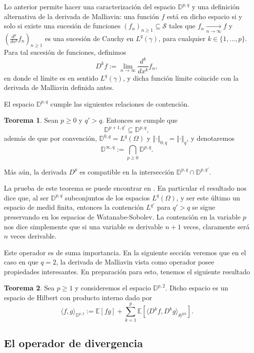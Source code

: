 \documentclass[letterpaper,twoside,12pt]{book}
\newcommand{\D}{\mathbb{D}}
\renewcommand{\S}{\mathcal{S}}
\newcommand{\E}{\mathbb{E}}
\newcommand{\1}{\mathds{1}}
\renewcommand{\to}{\rightarrow}
\newcommand{\norm}[1]{\left\Vert #1 \right\Vert}
\theoremstyle{definition}
\theoremstyle{definition}
\newtheorem{teo}{Teorema}
\theoremstyle{remark}
\theoremstyle{definition}
\theoremstyle{definition}
\theoremstyle{definition}
\theoremstyle{definition}
\theoremstyle{definition}
\begin{document}
Lo anterior permite hacer una caracterización del espacio $\D^{p,q}$ y una definición alternativa de la derivada de Malliavin: una función $f$ está en dicho espacio si y solo si existe una sucesión de funciones $(f_n)_{n\geq1}\subseteq \S$ tales que $f_n\xrightarrow[n\to\infty]{}f$ y $(\frac{d^{p}}{dx^{p}}f_n)_{n\geq1}$ es una sucesión de Cauchy en $L^q(\gamma)$, para cualquier $k\in \{1,...,p\}$. Para tal sucesión de funciones, definimos 
\[
D^{k}f:=\lim_{n\to \infty}\frac{d^k}{dx^{k}}f_n,
\]
en donde el límite es en sentido $L^{q}(\gamma)$, y dicha función límite coincide con la derivada de Malliavin definida antes.

El espacio $\D^{p,q}$ cumple las siguientes relaciones de contención.

\begin{teo}\label{teocontencionessobolev}
Sean $p\geq0$ y $q'>q$. Entonces se cumple que 
\[
\D^{p+1,q'}\subseteq \D^{p,q},
\]
además de que por convención, $\D^{0,q}=L^{q}(\Omega)$ y $\norm{\cdot}_{0,q}=\norm{\cdot}_{q}$, y denotaremos 
\[
\D^{\infty,q}:=\bigcap_{p\geq0} \D^{p,q}.
\]

Más aún, la derivada $D^{p}$ es compatible en la intersección $\D^{p,q}\cap \D^{p,q'}$.
\end{teo}
La prueba de este teorema se puede encontrar en \cite[p. 27]{nualart2006malliavin}. En particular el resultado nos dice que, al ser $\D^{p,q}$ subconjuntos de los espacios $L^{q}(\Omega)$, y ser este último un espacio de medid finita, entonces la contención $L^{q'}$ para $q'>q$ se sigue preservando en los espacios de Watanabe-Sobolev. La contención en la variable $p$ nos dice simplemente que si una variable es derivable $n+1$ veces, claramente será $n$ veces derivable.

Este operador es de suma importancia. En la siguiente sección veremos que en el caso en que $q=2$, la derivada de Malliavin vista como operador posee propiedades interesantes. En preparación para esto, tenemos el siguiente resultado
\begin{teo} 
 Sea $p\geq1$ y consideremos el espacio $\D^{p,2}$. Dicho espacio es un espacio de Hilbert con producto interno dado por 
 \[
 \langle f,g\rangle_{\D^{p,2}}:=\E\left[fg\right]+\sum_{k=1}^{p}\E\left[\langle D^{k}f,D^{k}g\rangle_{\mathfrak{H}^{\otimes k}}\right].
 \]
 \end{teo}

\subsection{El operador de divergencia}
\end{document}

